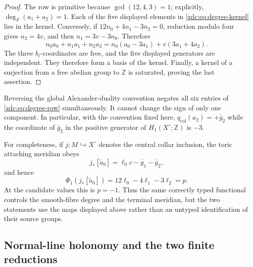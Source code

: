 \begin{proof}
The row is primitive because $\gcd(12,4,3)=1$; explicitly,
\(\deg_F(a_1+a_2)=1\).  Each of the five displayed elements in
\eqref{zdc:eq:degree-kernel} lies in the kernel.  Conversely, if
\(12n_0+4n_1-3n_2=0\), reduction modulo four gives $n_2=4v$, and then
$n_1=3v-3n_0$.  Therefore
\[
 n_0a_0+n_1a_1+n_2a_2
 =n_0(a_0-3a_1)+v(3a_1+4a_2).
\]
The three $b_i$-coordinates are free, and the five displayed generators
are independent.  They therefore form a basis of the kernel.  Finally, a
kernel of a surjection from a free abelian group to $\mathbb Z$ is
saturated, proving the last assertion.
\end{proof}

Reversing the global Alexander-duality convention negates all six entries
of \eqref{zdc:eq:degree-row} simultaneously.  It cannot change the sign of
only one component.  In particular, with the convention fixed here,
$q_{\mathrm{col}}(a_2)=+\bar g_2$ while the coordinate of $\bar g_2$ in the
positive generator of $H_1(X^\circ;\mathbb Z)$ is $-3$.

For completeness, if $j:M\hookrightarrow X^\circ$ denotes the central
collar inclusion, the toric attaching meridian obeys
\[
 j_*[\widetilde a_0]=\ell_0c-\bar g_1-\bar g_2,
\]
and hence
\[
 \Phi_1(j_*[\widetilde a_0])
 =12\ell_0-4\ell_1-3\ell_2=p.
\]
At the candidate values this is $p=-1$.  Thus the same correctly typed
functional controls the smooth-fibre degree and the terminal meridian, but
the two statements use the maps displayed above rather than an untyped
identification of their source groups.

\subsection{Normal-line holonomy and the two finite reductions}
\label{zdc:subsec:finite-holonomy}

